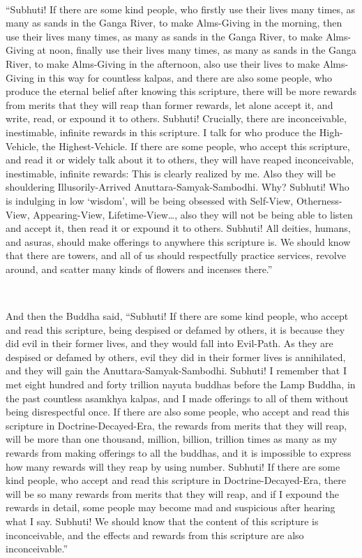 \documentclass[a5paper,12pt]{book}
\begin{document}
    ~

     ``Subhuti! If there are some kind people, who firstly use their lives many times, as many as sands in the Ganga River, to make Alms-Giving in the morning, then use their lives many times, as many as sands in the Ganga River, to make Alms-Giving at noon, finally use their lives many times, as many as sands in the Ganga River, to make Alms-Giving in the afternoon, also use their lives to make Alms-Giving in this way for countless kalpas, and there are also some people, who produce the eternal belief after knowing this scripture, there will be more rewards from merits that they will reap than former rewards, let alone accept it, and write, read, or expound it to others. Subhuti! Crucially, there are inconceivable, inestimable, infinite rewards in this scripture. I talk for who produce the High-Vehicle, the Highest-Vehicle. If there are some people, who accept this scripture, and read it or widely talk about it to others, they will have reaped inconceivable, inestimable, infinite rewards: This is clearly realized by me. Also they will be shouldering Illusorily-Arrived Anuttara-Samyak-Sambodhi. Why? Subhuti! Who is indulging in low `wisdom', will be being obsessed with Self-View, Otherness-View, Appearing-View, Lifetime-View\dots{}, also they will not be being able to listen and accept it, then read it or expound it to others. Subhuti! All deities, humans, and asuras, should make offerings to anywhere this scripture is. We should know that there are towers, and all of us should respectfully practice services, revolve around, and scatter many kinds of flowers and incenses there.''

    ~

     And then the Buddha said, ``Subhuti! If there are some kind people, who accept and read this scripture, being despised or defamed by others, it is because they did evil in their former lives, and they would fall into Evil-Path. As they are despised or defamed by others, evil they did in their former lives is annihilated, and they will gain the Anuttara-Samyak-Sambodhi. Subhuti! I remember that I met eight hundred and forty trillion nayuta buddhas before the Lamp Buddha, in the past countless asamkhya kalpas, and I made offerings to all of them without being disrespectful once. If there are also some people, who accept and read this scripture in Doctrine-Decayed-Era, the rewards from merits that they will reap, will be more than one thousand, million, billion, trillion times as many as my rewards from making offerings to all the buddhas, and it is impossible to express how many rewards will they reap by using number. Subhuti! If there are some kind people, who accept and read this scripture in Doctrine-Decayed-Era, there will be so many rewards from merits that they will reap, and if I expound the rewards in detail, some people may become mad and suspicious after hearing what I say. Subhuti! We should know that the content of this scripture is inconceivable, and the effects and rewards from this scripture are also inconceivable.''
\end{document}
